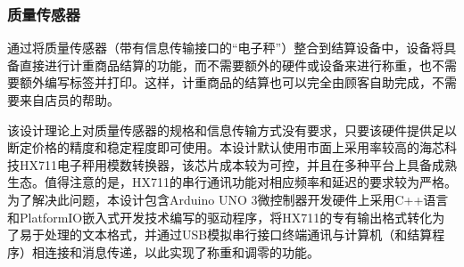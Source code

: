 \subsubsection{质量传感器}

通过将质量传感器（带有信息传输接口的“电子秤”）整合到结算设备中，设备将具备直接进行计重商品结算的功能，而不需要额外的硬件或设备来进行称重，也不需要额外编写标签并打印。这样，计重商品的结算也可以完全由顾客自助完成，不需要来自店员的帮助。

该设计理论上对质量传感器的规格和信息传输方式没有要求，只要该硬件提供足以断定价格的精度和稳定程度即可使用。本设计默认使用市面上采用率较高的海芯科技HX711电子秤用模数转换器，该芯片成本较为可控，并且在多种平台上具备成熟生态。值得注意的是，HX711的串行通讯功能对相应频率和延迟的要求较为严格。为了解决此问题，本设计包含Arduino UNO 3微控制器开发硬件上采用C++语言和PlatformIO嵌入式开发技术编写的驱动程序，将HX711的专有输出格式转化为了易于处理的文本格式，并通过USB模拟串行接口终端通讯与计算机（和结算程序）相连接和消息传递，以此实现了称重和调零的功能。